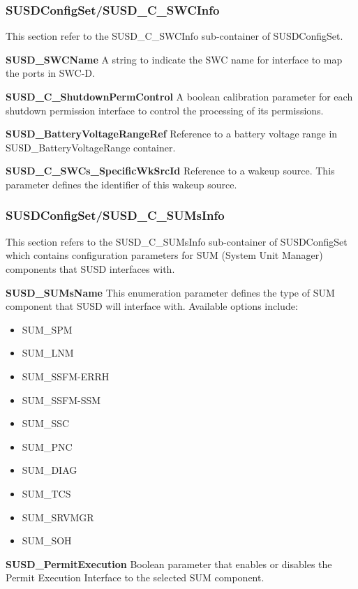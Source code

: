 {\subsubsection{SUSDConfigSet/SUSD\_C\_SWCInfo}
\label{subsection:SUSDSWCInfo}
This section refer to the SUSD\_C\_SWCInfo sub-container  of SUSDConfigSet.

\textbf{SUSD\_SWCName}\newline
A string to indicate the SWC name for interface to map the ports in SWC-D.

\textbf{SUSD\_C\_ShutdownPermControl}\newline
A boolean calibration parameter for each shutdown permission interface to control the processing of its permissions.

\textbf{SUSD\_BatteryVoltageRangeRef}\newline
Reference to a battery voltage range in SUSD\_BatteryVoltageRange container.

\textbf{SUSD\_C\_SWCs\_SpecificWkSrcId}\newline
Reference to a wakeup source. This parameter defines the identifier of this wakeup source.

\subsubsection{SUSDConfigSet/SUSD\_C\_SUMsInfo}
\label{subsection:SUSDSUMsInfo}
This section refers to the SUSD\_C\_SUMsInfo sub-container of SUSDConfigSet which contains configuration parameters for SUM (System Unit Manager) components that SUSD interfaces with.

\textbf{SUSD\_SUMsName}\newline
This enumeration parameter defines the type of SUM component that SUSD will interface with. Available options include:
\begin{itemize}
\item SUM\_SPM 
\item SUM\_LNM   
\item SUM\_SSFM-ERRH
\item SUM\_SSFM-SSM
\item SUM\_SSC 
\item SUM\_PNC 
\item SUM\_DIAG
\item SUM\_TCS
\item SUM\_SRVMGR
\item SUM\_SOH
\end{itemize}

\textbf{SUSD\_PermitExecution}\newline
Boolean parameter that enables or disables the Permit Execution Interface to the selected SUM component.

}
